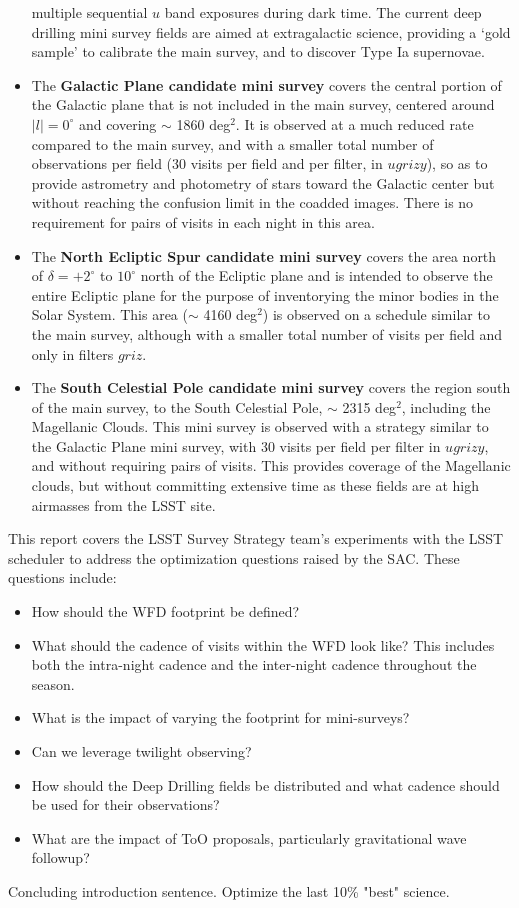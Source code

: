 \begin{itemize}
multiple sequential $u$ band exposures during dark time. The current deep drilling mini survey fields are aimed at extragalactic
science, providing a `gold sample' to calibrate the main survey, and to discover Type Ia supernovae. 
\item The {\bf Galactic Plane candidate mini survey} covers the central portion of the Galactic plane that is not included in the main survey, 
centered around $|l| = 0^\circ$ and covering $\sim$ 1860 deg$^2$.  It is observed at a much reduced rate compared to the main survey, 
and with a smaller total number of observations per field (30 visits per field and per filter, in $ugrizy$), so as to
provide astrometry and photometry of stars toward the Galactic center but without reaching the confusion limit in the coadded images.
There is no requirement for pairs of visits in each night in this area.
\item The {\bf North Ecliptic Spur candidate mini survey} covers the area north of $\delta = +2^\circ$ to $10^\circ$ north of the Ecliptic plane
and is intended to observe the entire Ecliptic plane for the purpose of inventorying the minor bodies in the Solar System. This area ($\sim$ 4160 deg$^2$) 
is observed on a schedule similar to the main survey, although with a smaller total number of visits per field and only in filters $griz$. 
\item The {\bf South Celestial Pole candidate mini survey} covers the region south of the main survey, to the South Celestial Pole, $\sim$ 2315 deg$^2$,
including the Magellanic Clouds. 
This mini survey is observed with a strategy similar to the Galactic Plane mini survey, with 30 visits per field per filter in $ugrizy$, 
and without requiring pairs of visits. This provides coverage of the Magellanic clouds, but without committing extensive time as these fields are
at high airmasses from the LSST site.
\end{itemize}

This report covers the LSST Survey Strategy team's experiments with the LSST scheduler to address the optimization questions raised by the SAC. These questions include:
\begin{itemize}
\item How should the WFD footprint be defined?
\item What should the cadence of visits within the WFD look like? This includes both the intra-night cadence and the inter-night cadence throughout the season.
\item What is the impact of varying the footprint for mini-surveys?
\item Can we leverage twilight observing?
\item How should the Deep Drilling fields be distributed and what cadence should be used for their observations?
\item What are the impact of ToO proposals, particularly gravitational wave followup?
\end{itemize}

Concluding introduction sentence. Optimize the last 10\% "best" science.


